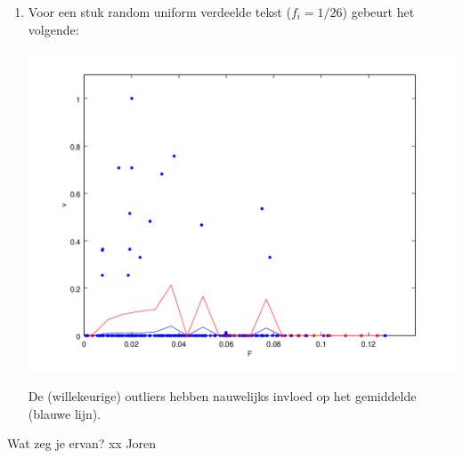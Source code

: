 \documentclass{article}
\begin{document}
\begin{enumerate}
\item Voor een stuk random uniform verdeelde tekst ($f_i = 1/26$) gebeurt het volgende:\\
\begin{minipage}{\textwidth}
    \begin{center}
        \includegraphics[width=\textwidth]{random_correlation}
    \end{center}
\end{minipage}
De (willekeurige) outliers hebben nauwelijks invloed op het gemiddelde (blauwe lijn).
\end{enumerate}

Wat zeg je ervan? xx Joren
\end{document}
